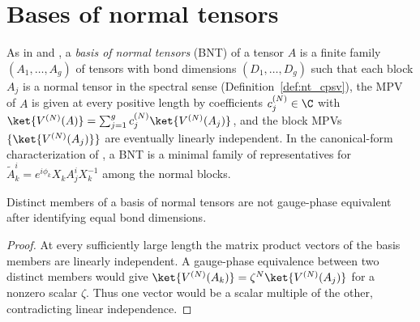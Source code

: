\section{Bases of normal tensors}

\begin{definition}\label{def:bnt_cpsv}
    \leanok
    As in \cite[Section~2.3]{Cirac2016MPDO_arXiv} and
    \cite[Definition~IV.2]{Cirac2021Matrix}, a \emph{basis of normal tensors}
    (BNT) of a tensor $A$ is a finite family $(A_1,\ldots,A_g)$ of tensors with
    bond dimensions $(D_1,\ldots,D_g)$ such that each block $A_j$ is a
    normal tensor in the spectral sense (Definition~\ref{def:nt_cpsv}), the
    MPV of $A$ is given at every positive length by coefficients
    $c_j^{(N)} \in \C$ with
    $\ket{V^{(N)}(A)} = \sum_{j=1}^{g} c_j^{(N)} \ket{V^{(N)}(A_j)}$, and the
    block MPVs $\{\ket{V^{(N)}(A_j)}\}$ are eventually linearly independent.
    In the canonical-form characterization of
    \cite[Section~2.3]{Cirac2016MPDO_arXiv}, a BNT is a minimal family of
    representatives for $\widetilde A_k^i=e^{i\phi_k}X_kA_j^iX_k^{-1}$ among
    the normal blocks.
\end{definition}

\begin{lemma}
    \label{thm:cpsv_bnt_blocks_not_gaugePhaseEquiv}
    \leanok
    Distinct members of a basis of normal tensors are not gauge-phase
    equivalent after identifying equal bond dimensions.
\end{lemma}

\begin{proof}\leanok
    At every sufficiently large length the matrix product vectors of the basis
    members are linearly independent. A gauge-phase equivalence between two
    distinct members would give
    $\ket{V^{(N)}(A_k)}=\zeta^N\ket{V^{(N)}(A_j)}$ for a nonzero scalar
    $\zeta$. Thus one vector would be a scalar multiple of the other,
    contradicting linear independence.
\end{proof}

